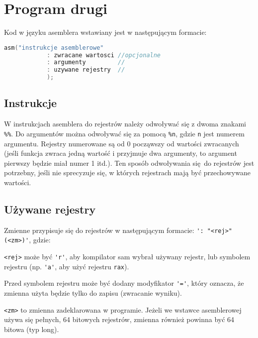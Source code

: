 \documentclass[polish, 11pt]{article}
\begin{document}
\section{Program drugi}
	Kod w języku asemblera wstawiany jest w następującym formacie:

	\begin{lstlisting}[language=C,frame=none,gobble=8]
		asm("instrukcje asemblerowe" 
			: zwracane wartosci //opcjonalne
			: argumenty			//
			: uzywane rejestry  //
			);			
	\end{lstlisting}

	\subsection{Instrukcje}
		W instrukcjach asemblera do rejestrów należy odwoływać się z dwoma znakami \verb|%%|.
		Do argumentów można odwoływać się za pomocą \verb|%n|, gdzie \verb|n| jest numerem argumentu.
		Rejestry numerowane są od 0 począwszy od wartości zwracanych
		(jeśli funkcja zwraca jedną wartość i przyjmuje dwa argumenty, to argument pierwszy będzie miał numer 1 itd.).
		Ten sposób odwoływania się do rejestrów jest potrzebny,
		jeśli nie sprecyzuje się, w których rejestrach mają być przechowywane wartości.

	\subsection{Używane rejestry}
		Zmienne przypisuje się do rejestrów w następującym formacie: \verb|': "<rej>"(<zm>)'|, gdzie:

		\verb|<rej>| może być \verb|'r'|, aby kompilator sam wybrał używany rejestr,
		lub symbolem rejestru (np. \verb|'a'|, aby użyć rejestru \verb|rax|).

		Przed symbolem rejestru może być dodany modyfikator \verb|'='|,
		który oznacza, że zmienna użyta będzie tylko do zapisu (zwracanie wyniku).

		\verb|<zm>| to zmienna zadeklarowana w programie.
		Jeżeli we wstawce asemblerowej używa się pełnych, 64 bitowych rejestrów,
		zmienna również powinna być 64 bitowa (typ long).
\end{document}
